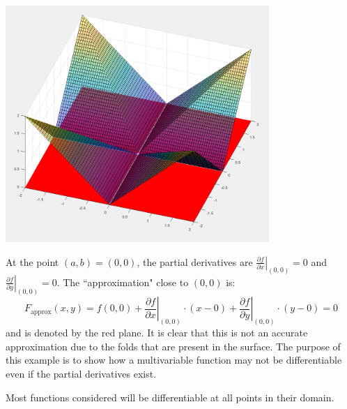 \documentclass{article}
\begin{document}
\begin{center}
\includegraphics[width = 0.75\textwidth]{non_differentiability_Matlab.png}
\end{center}

At the point \((a, b) = (0, 0)\), the partial derivatives are \(\left.\frac{\partial f}{\partial x}\right|_{(0,0)} = 0\) and \(\left.\frac{\partial f}{\partial y}\right|_{(0,0)} = 0\). The ``approximation" close to \((0, 0)\) is: 
\[F_{\text{approx}}(x, y) = f(0, 0) + \left.\frac{\partial f}{\partial x}\right|_{(0,0)} \cdot (x - 0) + \left.\frac{\partial f}{\partial y}\right|_{(0,0)} \cdot (y - 0) = 0\]
and is denoted by the red plane. It is clear that this is not an accurate approximation due to the folds that are present in the surface. The purpose of this example is to show how a multivariable function may not be differentiable even if the partial derivatives exist.

Most functions considered will be differentiable at all points in their domain.

\vspace{5mm}
\end{document}
